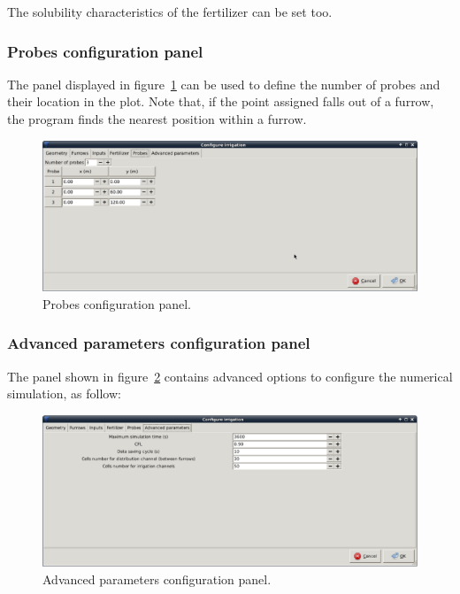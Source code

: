 \documentclass[review,authoryear]{elsarticle}
\begin{document}
The solubility characteristics of the fertilizer can be set too. 

\subsubsection{Probes configuration panel}

The panel displayed in figure~\ref{sondas} can be used to define the number of
probes and their location in the plot. Note that, if the point assigned falls
out of a furrow, the program finds the nearest position within a furrow.

\begin{figure}[!ht]
\begin{center}
\includegraphics[width=1125\UNIT]{confSondasEN.eps}
\caption{Probes configuration panel.}\label{sondas}
\end{center}
\end{figure}

\subsubsection{Advanced parameters configuration panel}

The panel shown in figure~\ref{param} contains advanced options to configure
the numerical simulation, as follow:

\begin{figure}[!ht]
\begin{center}
\includegraphics[width=1118\UNIT]{confParamEN.eps}
\caption{Advanced parameters configuration panel.}\label{param}
\end{center}
\end{figure}
\end{document}
